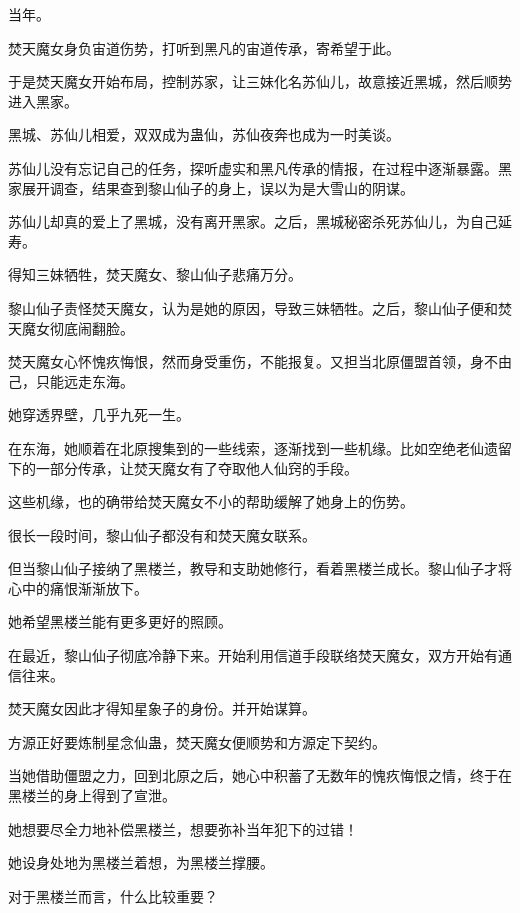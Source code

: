 
\begin{this_body}



当年。

焚天魔女身负宙道伤势，打听到黑凡的宙道传承，寄希望于此。

于是焚天魔女开始布局，控制苏家，让三妹化名苏仙儿，故意接近黑城，然后顺势进入黑家。

黑城、苏仙儿相爱，双双成为蛊仙，苏仙夜奔也成为一时美谈。

苏仙儿没有忘记自己的任务，探听虚实和黑凡传承的情报，在过程中逐渐暴露。黑家展开调查，结果查到黎山仙子的身上，误以为是大雪山的阴谋。

苏仙儿却真的爱上了黑城，没有离开黑家。之后，黑城秘密杀死苏仙儿，为自己延寿。

得知三妹牺牲，焚天魔女、黎山仙子悲痛万分。

黎山仙子责怪焚天魔女，认为是她的原因，导致三妹牺牲。之后，黎山仙子便和焚天魔女彻底闹翻脸。

焚天魔女心怀愧疚悔恨，然而身受重伤，不能报复。又担当北原僵盟首领，身不由己，只能远走东海。

她穿透界壁，几乎九死一生。

在东海，她顺着在北原搜集到的一些线索，逐渐找到一些机缘。比如空绝老仙遗留下的一部分传承，让焚天魔女有了夺取他人仙窍的手段。

这些机缘，也的确带给焚天魔女不小的帮助缓解了她身上的伤势。

很长一段时间，黎山仙子都没有和焚天魔女联系。

但当黎山仙子接纳了黑楼兰，教导和支助她修行，看着黑楼兰成长。黎山仙子才将心中的痛恨渐渐放下。

她希望黑楼兰能有更多更好的照顾。

在最近，黎山仙子彻底冷静下来。开始利用信道手段联络焚天魔女，双方开始有通信往来。

焚天魔女因此才得知星象子的身份。并开始谋算。

方源正好要炼制星念仙蛊，焚天魔女便顺势和方源定下契约。

当她借助僵盟之力，回到北原之后，她心中积蓄了无数年的愧疚悔恨之情，终于在黑楼兰的身上得到了宣泄。

她想要尽全力地补偿黑楼兰，想要弥补当年犯下的过错！

她设身处地为黑楼兰着想，为黑楼兰撑腰。

对于黑楼兰而言，什么比较重要？


\end{this_body}
